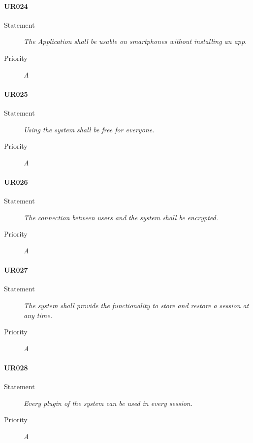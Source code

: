\paragraph{UR024}
\begin{description}
\item[Statement] \textit{The Application shall be usable on smartphones
    without installing an app.}
  \item[Priority]
    \textit{A}
\end{description}

\paragraph{UR025}
\begin{description}
\item[Statement] \textit{Using the system shall be free for everyone.}
\item[Priority] \textit{A}
\end{description}

\paragraph{UR026}
\begin{description}
\item[Statement] \textit{The connection between users and the system shall be
    encrypted.}
\item[Priority] \textit{A}
\end{description}

\paragraph{UR027}
\begin{description}
\item[Statement] \textit{The system shall provide the functionality to store
    and restore a session at any time.}
\item[Priority] \textit{A}
\end{description}

\paragraph{UR028}
\begin{description}
\item[Statement] \textit{Every plugin of the system can be used in every
    session.}
\item[Priority] \textit{A}
\end{description}

